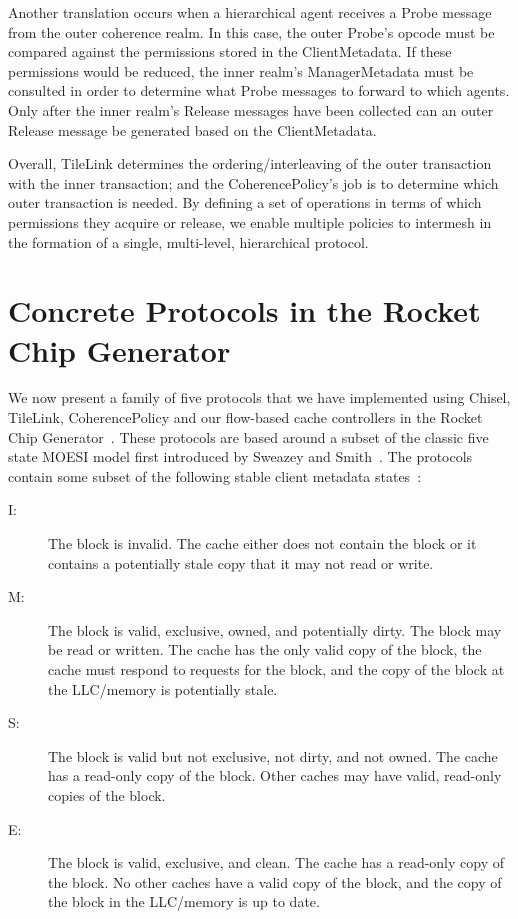 Another translation occurs when a hierarchical agent receives a Probe message from
the outer coherence realm.
In this case, the outer Probe's opcode must be compared against the permissions stored in the ClientMetadata.
If these permissions would be reduced, the inner realm's ManagerMetadata must be consulted in order
to determine what Probe messages to forward to which agents.
Only after the inner realm's Release messages have been collected can an outer Release message be generated
based on the ClientMetadata.

Overall, TileLink determines the ordering/interleaving of the outer transaction with the inner transaction;
and the CoherencePolicy's job is to determine which outer transaction is needed.
By defining a set of operations in terms of which permissions they acquire or release,
we enable multiple policies to intermesh in the formation of a single, multi-level, hierarchical protocol.


\section{Concrete Protocols in the Rocket Chip Generator}

We now present a family of five protocols that we have implemented using Chisel, TileLink, CoherencePolicy
and our flow-based cache controllers in the Rocket Chip Generator~\cite{rocket}.
These protocols are based around a subset of the classic five state MOESI model
first introduced by Sweazey and Smith~\cite{sweazey1986class}.
The protocols contain some subset of the following stable client metadata states~\cite{sorin2011primer}:
\begin{description}
\item[I:] The block is invalid. The cache either does not contain the block or it contains a potentially stale copy that it may not read or write.
\item[M:] The block is valid, exclusive, owned, and potentially dirty. The block may be
read or written. The cache has the only valid copy of the block, the cache must respond to
requests for the block, and the copy of the block at the LLC/memory is potentially stale. 
\item[S:] The block is valid but not exclusive, not dirty, and not owned. The cache has a read-only copy of the block. Other caches may have valid, read-only copies of the block.
\item[E:] The block is valid, exclusive, and clean. The cache has a read-only copy of the
block. No other caches have a valid copy of the block, and the copy of the block in the
LLC/memory is up to date. 
\end{description}

